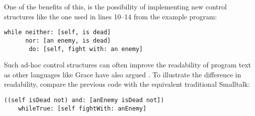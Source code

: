 One of the benefits of this, is the possibility of implementing new control structures like the one used in lines 10--14 from the example program: 

\begin{verbatim}
while neither: [self, is dead] 
	  nor: [an enemy, is dead] 
	   do: [self, fight with: an enemy] 
\end{verbatim}

Such ad-hoc control structures can often improve the readability of program text as other languages like Grace have also argued \cite{Grace12}. To illustrate the difference in readability, compare the previous code with the equivalent traditional Smalltalk: 

\begin{verbatim}
((self isDead not) and: [anEnemy isDead not]) 
	whileTrue: [self fightWith: anEnemy]
\end{verbatim}




